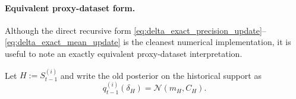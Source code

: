 \documentclass{article}
\begin{document}
\paragraph{Equivalent proxy-dataset form.}
Although the direct recursive form \eqref{eq:delta_exact_precision_update}--\eqref{eq:delta_exact_mean_update} is the cleanest numerical implementation, it is useful to note an exactly equivalent proxy-dataset interpretation.

Let $H:=S_{t-1}^{(i)}$ and write the old posterior on the historical support as
\begin{equation}
q_{t-1}^{(i)}(\delta_H)
=
\mathcal N(m_H,C_H).
\label{eq:old_hist_posterior}
\end{equation}
\end{document}

